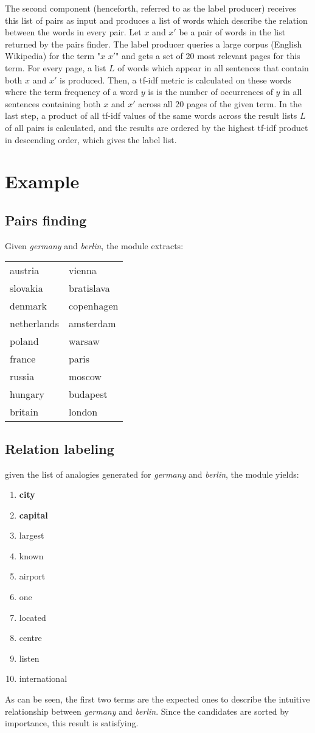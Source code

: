 \documentclass[11pt,a4paper]{article}
\begin{document}
The second component (henceforth, referred to as the label producer) receives this list of pairs as input and produces a list of words which describe the relation between the words in every pair. Let $x$ and $x'$ be a pair of words in the list returned by the pairs finder. The label producer queries a large corpus (English Wikipedia) for the term "$x$ $x'$" and gets a set of 20 most relevant pages for this term. For every page, a list $L$ of words which appear in all sentences that contain both $x$ and $x'$ is produced. Then, a tf-idf metric is calculated on these words where the term frequency of a word $y$ is is the number of occurrences of $y$ in all sentences containing both $x$ and $x'$ across all 20 pages of the given term. In the last step, a product of all tf-idf values of the same words across the result lists $L$ of all pairs is calculated, and the results are ordered by the highest tf-idf product in descending order, which gives the label list.
\section{Example}
\subsection{Pairs finding}
 Given \textit{germany} and \textit{berlin}, the module extracts:
\begin{tabular}{ l l }
  austria & vienna \\
  slovakia & bratislava \\
  denmark & copenhagen \\
  netherlands & amsterdam \\
  poland & warsaw \\
  france & paris \\
  russia & moscow \\
  hungary & budapest \\
  britain & london

\end{tabular}

\subsection{Relation labeling}
 given the list of analogies generated for \textit{germany} and \textit{berlin}, the module yields:
\begin{enumerate}
\itemsep0em 
\item \textbf{city}
\item \textbf{capital}
\item largest
\item known
\item airport
\item one
\item located
\item centre
\item listen
\item international
\end{enumerate}
As can be seen, the first two terms are the expected ones to describe the intuitive relationship between \textit{germany} and \textit{berlin}. Since the candidates are sorted by importance, this result is satisfying.
\end{document}
